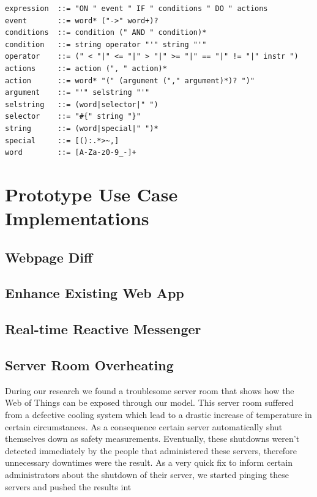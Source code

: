 \begin{lstlisting}[float=h,language=OwnRule,caption=Extended Backus-Naur Form of Prototype Rule Language Syntax]
expression  ::= "ON " event " IF " conditions " DO " actions
event       ::= word* ("->" word+)?
conditions  ::= condition (" AND " condition)*
condition   ::= string operator "'" string "'"
operator    ::= (" < "|" <= "|" > "|" >= "|" == "|" != "|" instr ")
actions     ::= action (", " action)*
action      ::= word* "(" (argument ("," argument)*)? ")"
argument    ::= "'" selstring "'"
selstring   ::= (word|selector|" ")
selector    ::= "#{" string "}"
string      ::= (word|special|" ")*
special     ::= [():.*>~,]
word        ::= [A-Za-z0-9_-]+
\end{lstlisting}





\section{Prototype Use Case Implementations}

\subsection{Webpage Diff}



\subsection{Enhance Existing Web App}



\subsection{Real-time Reactive Messenger}



\subsection{Server Room Overheating}

During our research we found a troublesome server room that shows how the \textrm{Web of Things} can be exposed through our model.
This server room suffered from a defective cooling system which lead to a drastic increase of temperature in certain circumstances.
As a consequence certain server automatically shut themselves down as safety measurements.
Eventually, these shutdowns weren't detected immediately by the people that administered these servers, therefore unnecessary downtimes were the result.
As a very quick fix to inform certain administrators about the shutdown of their server, we started pinging these servers and pushed the results int


